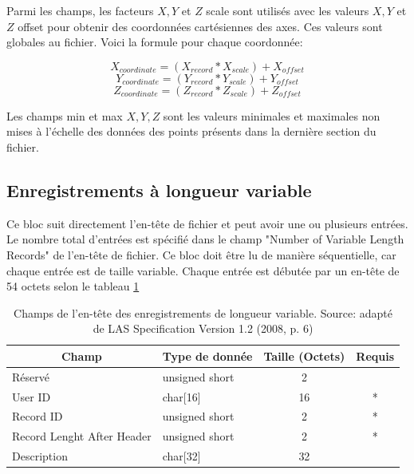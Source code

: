 Parmi les champs, les facteurs $ X, Y $ et $ Z $ scale sont utilisés avec les valeurs $ X, Y$ et $Z$ offset pour obtenir des coordonnées cartésiennes des axes.
Ces valeurs sont globales au fichier. Voici la formule pour chaque coordonnée:

\begin{equation*}
    X_{coordinate} = (X_{record} * X_{scale}) + X_{offset}
\end{equation*}
\begin{equation*}
    Y_{coordinate}= (Y_{record} * Y_{scale}) + Y_{offset}
\end{equation*}
\begin{equation*}
    Z_{coordinate}= (Z_{record} * Z_{scale}) + Z_{offset}
\end{equation*}

Les champs min et max $X, Y, Z$ sont les valeurs minimales et maximales non mises à l'échelle des données des points présents dans la dernière section du fichier.

\subsection{Enregistrements à longueur variable}

Ce bloc suit directement l'en-tête de fichier et peut avoir une ou plusieurs entrées.
Le nombre total d'entrées est spécifié dans le champ "Number of Variable Length Records" de l'en-tête de fichier.
Ce bloc doit être lu de manière séquentielle, car chaque entrée est de taille variable.
Chaque entrée est débutée par un en-tête de 54 octets selon le tableau \ref{tab:las_var_record_header}

\begin{table}[htbp!]
\centering
\begin{tabular}{|l|l|c|c|}
\hline
\multicolumn{1}{|c|}{\textbf{Champ}} & \multicolumn{1}{c|}{\textbf{Type de donnée}} & \textbf{Taille (Octets)} & \textbf{Requis} \\ \hline
Réservé                              & unsigned short                               & 2                        &                 \\ \hline
User ID                              & char{[}16{]}                                 & 16                       & *               \\ \hline
Record ID                            & unsigned short                               & 2                        & *               \\ \hline
Record Lenght After Header           & unsigned short                               & 2                        & *               \\ \hline
Description                          & char{[}32{]}                                 & 32                       &                 \\ \hline
\end{tabular}
\caption{
Champs de l'en-tête des enregistrements de longueur variable.
Source: adapté de LAS Specification Version 1.2 (2008, p. 6)}
\label{tab:las_var_record_header}
\end{table}

